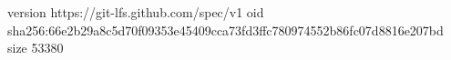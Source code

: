 version https://git-lfs.github.com/spec/v1
oid sha256:66e2b29a8c5d70f09353e45409cca73fd3ffc780974552b86fc07d8816e207bd
size 53380
